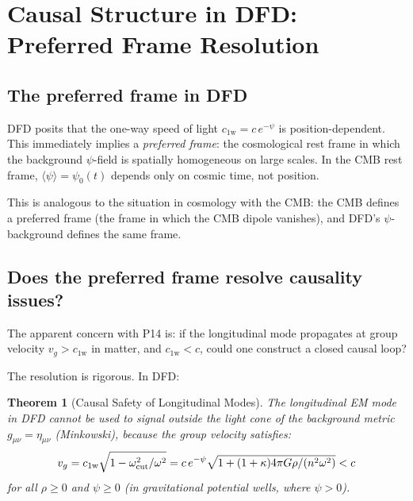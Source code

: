 \documentclass[11pt]{article}
\newtheorem{theorem}{Theorem}
\newcommand{\cfield}{c_{1\mathrm{w}}}
\begin{document}
\section{Causal Structure in DFD: Preferred Frame Resolution}
\label{sec:causality}

\subsection{The preferred frame in DFD}

DFD posits that the one-way speed of light $\cfield = c\,e^{-\psi}$
is position-dependent. This immediately implies a \textit{preferred
frame}: the cosmological rest frame in which the background $\psi$-field
is spatially homogeneous on large scales. In the CMB rest frame,
$\langle\psi\rangle = \psi_0(t)$ depends only on cosmic time, not position.

This is analogous to the situation in cosmology with the CMB: the
CMB defines a preferred frame (the frame in which the CMB dipole
vanishes), and DFD's $\psi$-background defines the same frame.

\subsection{Does the preferred frame resolve causality issues?}

The apparent concern with P14 is: if the longitudinal mode propagates
at group velocity $v_g > \cfield$ in matter, and $\cfield < c$, could
one construct a closed causal loop?

The resolution is rigorous. In DFD:

\begin{theorem}[Causal Safety of Longitudinal Modes]
The longitudinal EM mode in DFD cannot be used to signal outside
the light cone of the background metric $g_{\mu\nu} = \eta_{\mu\nu}$
(Minkowski), because the group velocity satisfies:
\begin{equation}
v_g = \cfield\sqrt{1 - \omega_{\rm cut}^2/\omega^2}
= c\,e^{-\psi}\sqrt{1 + (1+\kappa)4\pi G\rho/(n^2\omega^2)}
< c
\end{equation}
for all $\rho \geq 0$ and $\psi \geq 0$ (in gravitational potential
wells, where $\psi > 0$).
\end{theorem}
\end{document}
